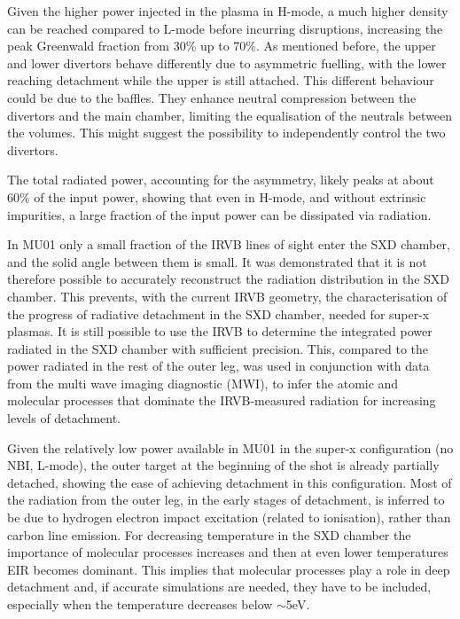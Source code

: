 Given the higher power injected in the plasma in H-mode, a much higher density can be reached compared to L-mode before incurring disruptions, increasing the peak Greenwald fraction from 30\% up to 70\%. As mentioned before, the upper and lower divertors behave differently due to asymmetric fuelling, with the lower reaching detachment while the upper is still attached. This different behaviour could be due to the baffles. They enhance neutral compression between the divertors and the main chamber, limiting the equalisation of the neutrals between the volumes. This might suggest the possibility to independently control the two divertors.

The total radiated power, accounting for the asymmetry, likely peaks at about 60\% of the input power, showing that even in H-mode, and without extrinsic impurities, a large fraction of the input power can be dissipated via radiation.


In MU01 only a small fraction of the IRVB lines of sight enter the SXD chamber, and the solid angle between them is small. It was demonstrated that it is not therefore possible to accurately reconstruct the radiation distribution in the SXD chamber. This prevents, with the current IRVB geometry, the characterisation of the progress of radiative detachment in the SXD chamber, needed for super-x plasmas. It is still possible to use the IRVB to determine the integrated power radiated in the SXD chamber with sufficient precision. This, compared to the power radiated in the rest of the outer leg, was used in conjunction with data from the multi wave imaging diagnostic (MWI), to infer the atomic and molecular processes that dominate the IRVB-measured radiation for increasing levels of detachment.

Given the relatively low power available in MU01 in the super-x configuration (no NBI, L-mode), the outer target at the beginning of the shot is already partially detached, showing the ease of achieving detachment in this configuration. Most of the radiation from the outer leg, in the early stages of detachment, is inferred to be due to hydrogen electron impact excitation (related to ionisation), rather than carbon line emission. For decreasing temperature in the SXD chamber the importance of molecular processes increases and then at even lower temperatures EIR becomes dominant.
This implies that molecular processes play a role in deep detachment and, if accurate simulations are needed, they have to be included, especially when the temperature decreases below $\sim$5eV.





